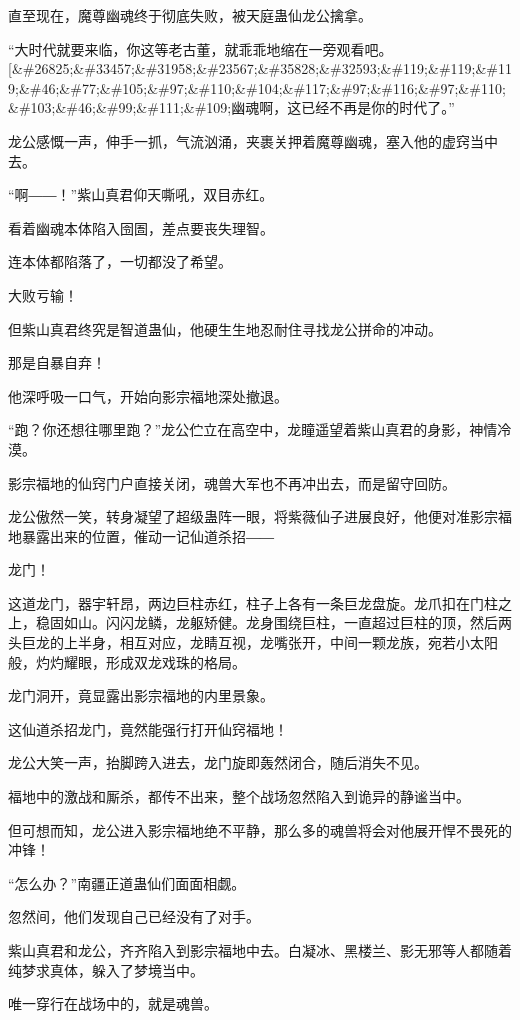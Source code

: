 \begin{this_body}
直至现在，魔尊幽魂终于彻底失败，被天庭蛊仙龙公擒拿。

“大时代就要来临，你这等老古董，就乖乖地缩在一旁观看吧。[\&\#26825;\&\#33457;\&\#31958;\&\#23567;\&\#35828;\&\#32593;\&\#119;\&\#119;\&\#119;\&\#46;\&\#77;\&\#105;\&\#97;\&\#110;\&\#104;\&\#117;\&\#97;\&\#116;\&\#97;\&\#110;\&\#103;\&\#46;\&\#99;\&\#111;\&\#109;幽魂啊，这已经不再是你的时代了。”

龙公感慨一声，伸手一抓，气流汹涌，夹裹关押着魔尊幽魂，塞入他的虚窍当中去。

“啊――！”紫山真君仰天嘶吼，双目赤红。

看着幽魂本体陷入囹圄，差点要丧失理智。

连本体都陷落了，一切都没了希望。

大败亏输！

但紫山真君终究是智道蛊仙，他硬生生地忍耐住寻找龙公拼命的冲动。

那是自暴自弃！

他深呼吸一口气，开始向影宗福地深处撤退。

“跑？你还想往哪里跑？”龙公伫立在高空中，龙瞳遥望着紫山真君的身影，神情冷漠。

影宗福地的仙窍门户直接关闭，魂兽大军也不再冲出去，而是留守回防。

龙公傲然一笑，转身凝望了超级蛊阵一眼，将紫薇仙子进展良好，他便对准影宗福地暴露出来的位置，催动一记仙道杀招――

龙门！

这道龙门，器宇轩昂，两边巨柱赤红，柱子上各有一条巨龙盘旋。龙爪扣在门柱之上，稳固如山。闪闪龙鳞，龙躯矫健。龙身围绕巨柱，一直超过巨柱的顶，然后两头巨龙的上半身，相互对应，龙睛互视，龙嘴张开，中间一颗龙族，宛若小太阳般，灼灼耀眼，形成双龙戏珠的格局。

龙门洞开，竟显露出影宗福地的内里景象。

这仙道杀招龙门，竟然能强行打开仙窍福地！

龙公大笑一声，抬脚跨入进去，龙门旋即轰然闭合，随后消失不见。

福地中的激战和厮杀，都传不出来，整个战场忽然陷入到诡异的静谧当中。

但可想而知，龙公进入影宗福地绝不平静，那么多的魂兽将会对他展开悍不畏死的冲锋！

“怎么办？”南疆正道蛊仙们面面相觑。

忽然间，他们发现自己已经没有了对手。

紫山真君和龙公，齐齐陷入到影宗福地中去。白凝冰、黑楼兰、影无邪等人都随着纯梦求真体，躲入了梦境当中。

唯一穿行在战场中的，就是魂兽。


\end{this_body}
